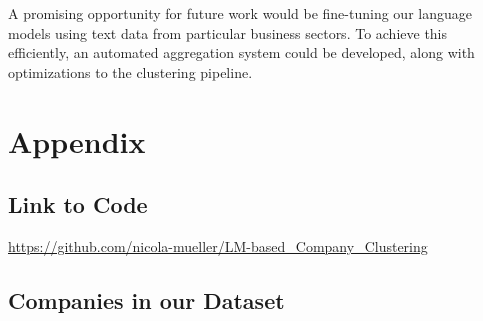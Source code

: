 \documentclass[12pt]{article}
\begin{document}
   A promising opportunity for future work would be fine-tuning our language models using text data from particular business sectors. To achieve this efficiently, an automated aggregation system could be developed, along with optimizations to the clustering pipeline.

    
    
	
	
	
	\newpage
	\section{Appendix}
	
	\subsection{Link to Code}
	\url{https://github.com/nicola-mueller/LM-based_Company_Clustering}
	
	\subsection{Companies in our Dataset}
	\label{sec:appendix-companies}
	
\end{document}

